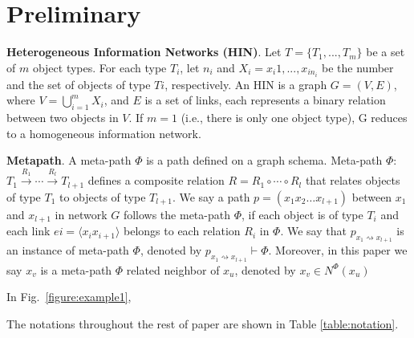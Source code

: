 \section{Preliminary}
\label{sec:pre}

\begin{definition}
\textbf{ Heterogeneous Information Networks (HIN)}\cite{JiSDHG10}. 
Let $T = \{T_1, ..., T_m\}$ be a set of $m$ object types.
For each type $T_i$, let $n_i$ and $X_i = {x_i1, ..., x_{in_i} }$ be the number and the set of objects of type $Ti$, respectively. An HIN
is a graph $G = (V, E)$, where $V =
\bigcup\limits_{i=1}^{m} X_i$, and $E$ is a set of
links, each represents a binary relation between two objects
in $V$. If $m = 1$ (i.e., there is only one object type), G reduces
to a homogeneous information network. 
\end{definition}

\begin{example}
\end{example}

\begin{definition}
\textbf{Metapath}\citep{SunHYYW11}. 
A meta-path $\Phi$ is a path defined on a graph schema. Meta-path $\Phi$: $T_1 \stackrel{R_1}{\longrightarrow} \cdots \stackrel{R_l}{\longrightarrow} T_{l+1}$ defines a composite relation $R = R_1 \circ \cdots \circ R_l$ that relates objects of type $T_1$ to objects of type $T_{l+1}$. 
We say a path $p = (x_1x_2\ldots x_{l+1})$ between $x_1$ and $x_{l+1}$ in network $G$ follows the meta-path $\Phi$, if each object is of type $T_i$ and each link $ei = \langle x_ix_{i+1}\rangle$ belongs to each relation $R_i$ in $\Phi$. 
We say that $p_{x_1 \rightsquigarrow x_{l+1}}$ is an instance of meta-path $\Phi$, denoted by $p_{x_1 \rightsquigarrow x_{l+1}} \vdash \Phi$.
Moreover, in this paper we say $x_v$ is a meta-path $\Phi$ related neighbor of $x_u$, denoted by $x_v \in N^\Phi(x_u)$

\end{definition}

\begin{example}
In Fig.~\ref{figure:example1},
\end{example}



The notations throughout the rest of paper are shown in Table \ref{table:notation}.


